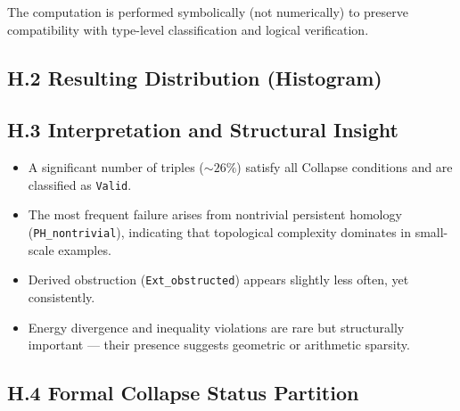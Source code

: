 \documentclass[11pt]{article}
\begin{document}
The computation is performed symbolically (not numerically) to preserve compatibility with type-level classification  
and logical verification.

\subsection*{H.2 Resulting Distribution (Histogram)}

\begin{center}
\end{center}

\subsection*{H.3 Interpretation and Structural Insight}

\begin{itemize}
  \item A significant number of triples (\( \sim 26\% \)) satisfy all Collapse conditions and are classified as \texttt{Valid}.
  \item The most frequent failure arises from nontrivial persistent homology (\texttt{PH\_nontrivial}),  
  indicating that topological complexity dominates in small-scale examples.
  \item Derived obstruction (\texttt{Ext\_obstructed}) appears slightly less often, yet consistently.
  \item Energy divergence and inequality violations are rare but structurally important — their presence  
  suggests geometric or arithmetic sparsity.
\end{itemize}

\subsection*{H.4 Formal Collapse Status Partition}
\end{document}
